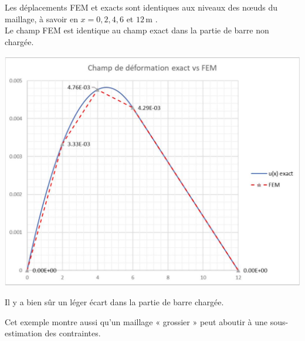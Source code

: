 \documentclass[11pt,a4paper]{report}
\begin{document}
\begin{enumerate}[start=7]
{\begin{mdframed}
      Les déplacements FEM et exacts sont identiques aux niveaux des nœuds du maillage, à savoir en $x=0,2,4,6$ et $12\,\mathrm{m}$ .\\

      Le champ FEM est identique au champ exact dans la partie de barre non chargée. 

      \includegraphics[max width=\textwidth, center]{2025_10_03_26e11264345fd9bad5cag-8}
      
      Il y a bien sûr un léger écart dans la partie de barre chargée. 

      Cet exemple montre aussi qu'un maillage « grossier » peut aboutir à une sous-estimation des contraintes.    
    \end{mdframed}
  }{
  }
\end{enumerate}
\end{document}
